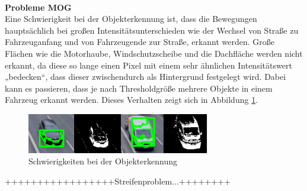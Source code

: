 \documentclass[conference]{IEEEtran}
\begin{document}
	\\
	\textbf{Probleme MOG}\\
	Eine Schwierigkeit bei der Objekterkennung ist, dass die Bewegungen hauptsächlich bei großen Intensitätsunterschieden wie der Wechsel von Straße zu Fahrzeuganfang und von Fahrzeugende zur Straße, erkannt werden. Große Flächen wie die Motorhaube, Windschutzscheibe und die Dachfläche werden nicht erkannt, da diese so lange einen Pixel mit einem sehr ähnlichen Intensitätswert „bedecken“, dass dieser zwischendurch als Hintergrund festgelegt wird. Dabei kann es passieren, dass je nach Thresholdgröße mehrere Objekte in einem Fahrzeug erkannt werden. Dieses Verhalten zeigt sich in Abbildung \ref{mogFehler}.
	\begin{figure}[!h]
		\begin{center}
			\includegraphics[width=8cm]{Media/MOGVergleich.png}
			\caption{Schwierigkeiten bei der Objekterkennung}
			\label{mogFehler}
		\end{center}
	\end{figure}
	+++++++++++++++++Streifenproblem...++++++++
	
\end{document}
